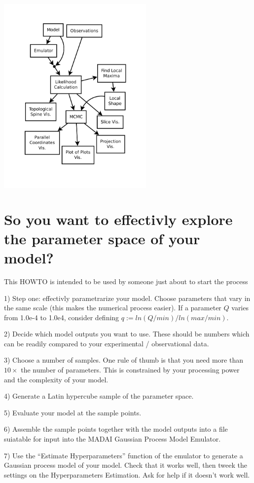\documentclass{article}
\begin{document}
\begin{center}
\includegraphics[width=3in]{figures/MADAI_Stats_and_Vis.pdf}
\end{center}


\section{ So you want to effectivly explore the parameter space of your model?}

This HOWTO is intended to be used by someone just about to start the
process

1) Step one: effectivly parametrarize your model. Choose parameters
that vary in the same scale (this makes the numerical process
easier). If a parameter $Q$ varies from 1.0e-4 to 1.0e4, consider
defining $q := ln(Q/min)/ln(max/min)$.

2) Decide which model outputs you want to use. These should be numbers
which can be readily compared to your experimental / observational
data.

3) Choose a number of samples. One rule of thumb is that you need more
than $10×$ the number of parameters. This is constrained by your
processing power and the complexity of your model.

4) Generate a Latin hypercube sample of the parameter space. 

5) Evaluate your model at the sample points.

6) Assemble the sample points together with the model outputs into a
file suiatable for input into the MADAI Gaussian Process Model
Emulator.

7) Use the “Estimate Hyperparameters” function of the emulator to
generate a Gaussian process model of your model. Check that it works
well, then tweek the settings on the Hyperparameters Estimation. Ask
for help if it doesn’t work well.
\end{document}
